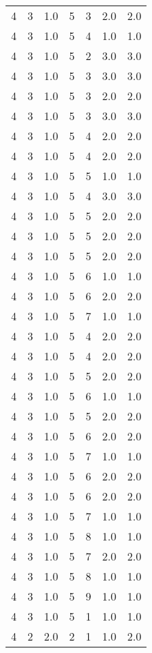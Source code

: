 \documentclass[a4paper,12pt]{article}
\begin{document}
\begin{center}
\begin{longtable}{ c c c | c c c | c }
        4 & 3 & 1.0 & 5 & 3 & 2.0 & 2.0 \\
        4 & 3 & 1.0 & 5 & 4 & 1.0 & 1.0 \\
        4 & 3 & 1.0 & 5 & 2 & 3.0 & 3.0 \\
        4 & 3 & 1.0 & 5 & 3 & 3.0 & 3.0 \\
        4 & 3 & 1.0 & 5 & 3 & 2.0 & 2.0 \\
        4 & 3 & 1.0 & 5 & 3 & 3.0 & 3.0 \\
        4 & 3 & 1.0 & 5 & 4 & 2.0 & 2.0 \\
        4 & 3 & 1.0 & 5 & 4 & 2.0 & 2.0 \\
        4 & 3 & 1.0 & 5 & 5 & 1.0 & 1.0 \\
        4 & 3 & 1.0 & 5 & 4 & 3.0 & 3.0 \\
        4 & 3 & 1.0 & 5 & 5 & 2.0 & 2.0 \\
        4 & 3 & 1.0 & 5 & 5 & 2.0 & 2.0 \\
        4 & 3 & 1.0 & 5 & 5 & 2.0 & 2.0 \\
        4 & 3 & 1.0 & 5 & 6 & 1.0 & 1.0 \\
        4 & 3 & 1.0 & 5 & 6 & 2.0 & 2.0 \\
        4 & 3 & 1.0 & 5 & 7 & 1.0 & 1.0 \\
        4 & 3 & 1.0 & 5 & 4 & 2.0 & 2.0 \\
        4 & 3 & 1.0 & 5 & 4 & 2.0 & 2.0 \\
        4 & 3 & 1.0 & 5 & 5 & 2.0 & 2.0 \\
        4 & 3 & 1.0 & 5 & 6 & 1.0 & 1.0 \\
        4 & 3 & 1.0 & 5 & 5 & 2.0 & 2.0 \\
        4 & 3 & 1.0 & 5 & 6 & 2.0 & 2.0 \\
        4 & 3 & 1.0 & 5 & 7 & 1.0 & 1.0 \\
        4 & 3 & 1.0 & 5 & 6 & 2.0 & 2.0 \\
        4 & 3 & 1.0 & 5 & 6 & 2.0 & 2.0 \\
        4 & 3 & 1.0 & 5 & 7 & 1.0 & 1.0 \\
        4 & 3 & 1.0 & 5 & 8 & 1.0 & 1.0 \\
        4 & 3 & 1.0 & 5 & 7 & 2.0 & 2.0 \\
        4 & 3 & 1.0 & 5 & 8 & 1.0 & 1.0 \\
        4 & 3 & 1.0 & 5 & 9 & 1.0 & 1.0 \\
        4 & 3 & 1.0 & 5 & 1 & 1.0 & 1.0 \\
        4 & 2 & 2.0 & 2 & 1 & 1.0 & 2.0 \\

\end{longtable}
\end{center}
\end{document}
